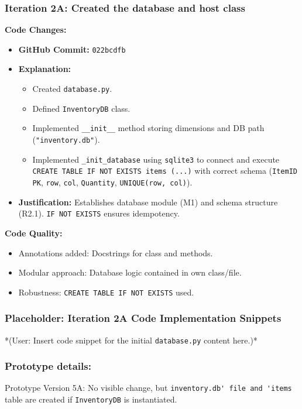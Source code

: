 \subsubsection{Iteration 2A: Created the database and host class}

\textbf{Code Changes:}
\begin{itemize}
	\item \textbf{GitHub Commit:} \verb|022bcdfb|
	\item \textbf{Explanation:}
	\begin{itemize}
		\item Created \verb|database.py|.
		\item Defined \verb|InventoryDB| class.
		\item Implemented \verb|__init__| method storing dimensions and DB path (\verb|"inventory.db"|).
		\item Implemented \verb|_init_database| using \verb|sqlite3| to connect and execute \verb|CREATE TABLE IF NOT EXISTS items (...)| with correct schema (\verb|ItemID PK|, \verb|row|, \verb|col|, \verb|Quantity|, \verb|UNIQUE(row, col)|).
	\end{itemize}
	\item \textbf{Justification:} Establishes database module (M1) and schema structure (R2.1). \verb|IF NOT EXISTS| ensures idempotency.
\end{itemize}

\textbf{Code Quality:}
\begin{itemize}
	\item Annotations added: Docstrings for class and methods.
	\item Modular approach: Database logic contained in own class/file.
	\item Robustness: \verb|CREATE TABLE IF NOT EXISTS| used.
\end{itemize}

\newpage
\subsubsection*{Placeholder: Iteration 2A Code Implementation Snippets}
*(User: Insert code snippet for the initial \verb|database.py| content here.)*
\newpage

\subsubsection{Prototype details:}
Prototype Version 5A: No visible change, but \verb|inventory.db' file and 'items| table are created if \verb|InventoryDB| is instantiated.

